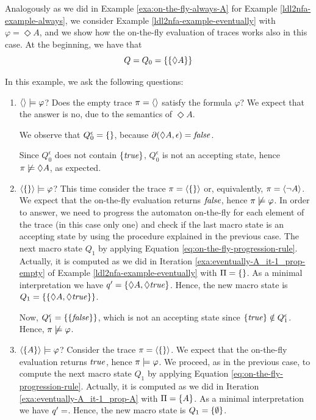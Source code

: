 \begin{example}\label{exa:on-the-fly-eventually-A}
	Analogously as we did in Example \ref{exa:on-the-fly-always-A} for Example \ref{ldl2nfa-example-always}, we consider Example \ref{ldl2nfa-example-eventually} with $\varphi = \Diamond A$, and we show how the on-the-fly evaluation of traces works also in this case.
	At the beginning, we have that $$Q = Q_0 = \{\{\Diamond A\}\}$$
	
	In this example, we ask the following questions:
	\begin{enumerate}
		\item $\langle  \rangle \models \varphi$? Does the empty trace $\pi = \langle  \rangle$ satisfy the formula $\varphi$? We expect that the answer is no, due to the semantics of $\Diamond A$. 
		
		We observe that $Q_0^\epsilon = \{\}$,
		because $\partial\lparen \Diamond A, \epsilon\rparen = \mathit{false}$.
		
		Since $Q_0^\epsilon$ does not contain $\{\mathit{true}\}$, $Q_0^\epsilon$ is not an accepting state, hence $\pi \not\models \Diamond A$, as expected.
		
		\item $\langle \{\} \rangle \models \varphi$? This time consider the trace $\pi = \langle \{\} \rangle$ or, equivalently, $\pi = \langle \lnot A \rangle$. We expect that the on-the-fly evaluation returns $\mathit{false}$, hence $\pi \not \models \varphi$. In order to answer, we need to progress the automaton on-the-fly for each element of the trace (in this case only one) and check if the last macro state is an accepting state by using the procedure explained in the previous case.
		The next macro state $Q_1$ by applying Equation \ref{eq:on-the-fly-progression-rule}. Actually, it is computed as we did in Iteration \ref{exa:eventually-A_it-1_prop-empty} of Example \ref{ldl2nfa-example-eventually} with $\Pi = \{\}$. 
		 As a minimal interpretation we have $q' = \{\Diamond A, \Diamond \mathit{true}\}$. Hence, the new macro state is $Q_1 = \{\{\Diamond A, \Diamond \mathit{true}\}\}$.
		 
		Now, $Q_1^\epsilon = \{\{\mathit{false}\}\}$, which is not an accepting state since $\{\mathit{true}\} \notin Q_1^\epsilon$. Hence, $\pi \not \models \varphi$.\label{exa:on-the-fly-eventually-A-trace-false}
		
		\item $\langle \{A\} \rangle \models \varphi$? Consider the trace $\pi = \langle \{\} \rangle$. We expect that the on-the-fly evaluation returns $\mathit{true}$, hence $\pi \models \varphi$. We proceed, as in the previous case, to compute the next macro state $Q_1$ by applying Equation \ref{eq:on-the-fly-progression-rule}. Actually, it is computed as we did in Iteration \ref{exa:eventually-A_it-1_prop-A} with $\Pi = \{A\}$. As a minimal interpretation we have $q' = \empty$. Hence, the new macro state is $Q_1 = \{\emptyset\}$.
		

\end{enumerate}
\end{example}
